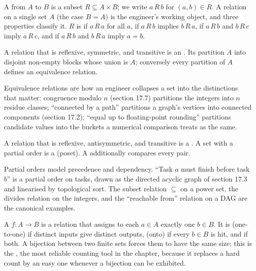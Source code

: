 A  from $A$ to $B$ is a subset $R \subseteq A
\times B$; we write $a\, R\, b$ for $(a, b) \in R$. A relation on a
single set $A$ (the case $B = A$) is the engineer's working object,
and three properties classify it. $R$ is  if
$a\, R\, a$ for all $a$,  if $a\, R\, b$ implies
$b\, R\, a$,  if $a\, R\, b$ and $b\, R\, c$
imply $a\, R\, c$, and  if $a\, R\, b$ and
$b\, R\, a$ imply $a = b$.

\begin{definition}
A relation that is reflexive, symmetric, and transitive is an
. Its 
partition $A$ into disjoint non-empty blocks whose union is $A$;
conversely every partition of $A$ defines an equivalence relation.
\end{definition}

Equivalence relations are how an engineer collapses a set into the
distinctions that matter: congruence modulo $n$ (section 17.7)
partitions the integers into $n$ residue classes; ``connected by a
path'' partitions a graph's vertices into connected components
(section 17.2); ``equal up to floating-point rounding'' partitions
candidate values into the buckets a numerical comparison treats as
the same.

\begin{definition}
A relation that is reflexive, antisymmetric, and transitive is a
. A set with a partial order is a
 (poset). A 
additionally compares every pair.
\end{definition}

Partial orders model precedence and dependency. ``Task $a$ must
finish before task $b$'' is a partial order on tasks, drawn as the
directed acyclic graph of section 17.3 and linearised by topological
sort. The subset relation $\subseteq$ on a power set, the divides
relation on the integers, and the ``reachable from'' relation on a
DAG are the canonical examples.

A  $f: A \to B$ is a relation that assigns to each
$a \in A$ exactly one $b \in B$. It is 
(one-to-one) if distinct inputs give distinct outputs,
 (onto) if every $b \in B$ is hit, and
 if both. A bijection between two finite sets
forces them to have the same size; this is the , the most reliable counting tool in the chapter, because
it replaces a hard count by an easy one whenever a bijection can be
exhibited.

